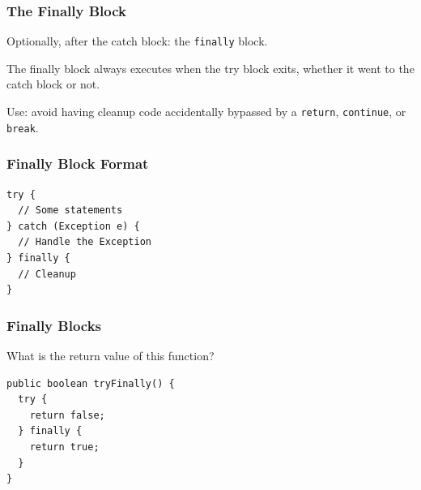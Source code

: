 \begin{frame}
\frametitle{The Finally Block}
\begin{changemargin}{1cm}

Optionally, after the catch block: the \texttt{finally} block. 

The finally block always executes when the try block exits, whether it went to the catch block or not. 

Use: avoid having cleanup code accidentally bypassed by a \texttt{return}, \texttt{continue}, or \texttt{break}.

\end{changemargin}
\end{frame}


\begin{frame}[fragile]
\frametitle{Finally Block Format}
\begin{changemargin}{1cm}
\begin{verbatim}
try {
  // Some statements   
} catch (Exception e) {
  // Handle the Exception
} finally {
  // Cleanup
}
\end{verbatim}
\end{changemargin}
\end{frame}

\begin{frame}[fragile]
\frametitle{Finally Blocks}
\begin{changemargin}{1cm}
What is the return value of this function?

\begin{verbatim}
public boolean tryFinally() {
  try {
    return false;
  } finally {
    return true;
  }
}
\end{verbatim}
\end{changemargin}
\end{frame}


